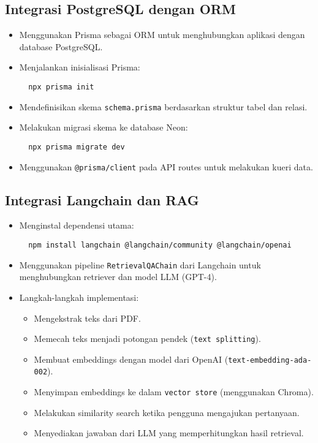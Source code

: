 \subsection{Integrasi PostgreSQL dengan ORM}

\begin{itemize}
  \item Menggunakan Prisma sebagai ORM untuk menghubungkan aplikasi dengan database PostgreSQL.
  \item Menjalankan inisialisasi Prisma:
  \begin{verbatim}
  npx prisma init
  \end{verbatim}
  \item Mendefinisikan skema \texttt{schema.prisma} berdasarkan struktur tabel dan relasi.
  \item Melakukan migrasi skema ke database Neon:
  \begin{verbatim}
  npx prisma migrate dev
  \end{verbatim}
  \item Menggunakan \texttt{@prisma/client} pada API routes untuk melakukan kueri data.
\end{itemize}

\subsection{Integrasi Langchain dan RAG}

\begin{itemize}
  \item Menginstal dependensi utama:
  \begin{verbatim}
  npm install langchain @langchain/community @langchain/openai
  \end{verbatim}
  \item Menggunakan pipeline \texttt{RetrievalQAChain} dari Langchain untuk menghubungkan retriever dan model LLM (GPT-4).
  \item Langkah-langkah implementasi:
  \begin{itemize}
    \item Mengekstrak teks dari PDF.
    \item Memecah teks menjadi potongan pendek (\texttt{text splitting}).
    \item Membuat embeddings dengan model dari OpenAI (\texttt{text-embedding-ada-002}).
    \item Menyimpan embeddings ke dalam \texttt{vector store} (menggunakan Chroma).
    \item Melakukan similarity search ketika pengguna mengajukan pertanyaan.
    \item Menyediakan jawaban dari LLM yang memperhitungkan hasil retrieval.
  \end{itemize}
\end{itemize}

